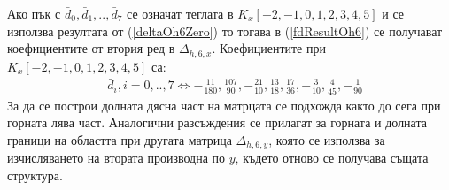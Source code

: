\documentclass{article}
\newcommand{\rf}[1]{(\ref{#1})}
\begin{document}
Ако пък с $\bar d_0, \bar d_1, .., \bar d_7$ се означат теглата в $K_x[-2,-1,0,1,2,3,4,5]$ и се използва резултата от \rf{deltaOh6Zero} то тогава в \rf{fdResultOh6} се получават коефициентите от втория ред в  $\Delta_{h,6,x}$. Коефициентите при $K_x[-2,-1,0,1,2,3,4,5]$ са:
\begin{align}
&\bar d_i, i = 0,..,7 \iff -\frac{11}{180}, \frac{107}{90}, -\frac{21}{10}, \frac{13}{18}, \frac{17}{36}, -\frac{3}{10}, \frac{4}{45}, -\frac{1}{90}
\end{align}
За да се построи долната дясна част на матрцата се подхожда както до сега при горната лява част. Аналогични разсъждения се прилагат за горната и долната граници на областта при другата матрица $\Delta_{h,6,y}$, която се използва за изчисляването на втората производна по $y$, където отново се получава същата структура.
\end{document}
